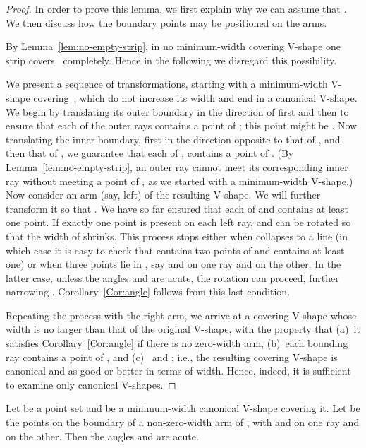 \documentclass{llncs}
\begin{document}
\begin{proof}

In order to prove this lemma, we first explain why we can assume
that .  We then discuss how
the boundary points may be positioned on the arms.


By Lemma~\ref{lem:no-empty-strip}, in no minimum-width covering V-shape
one strip covers~ completely.
Hence in the following we disregard this
possibility.

We present a sequence of transformations, starting with a minimum-width
V-shape covering~, which do not
increase its width and end in a canonical V-shape.  We begin by
translating its outer boundary in the direction of first  and
then  to ensure that each of the outer rays contains a point of ;
this point might be .  Now translating the inner boundary, first in
the direction opposite to that of , and then that of , we
guarantee that each of ,  contains a point of .  (By
Lemma~\ref{lem:no-empty-strip}, an outer ray  cannot meet its
corresponding inner ray  without meeting a point of , as we
started with a minimum-width V-shape.)  Now consider an arm (say,
left) of the resulting V-shape.  We will further transform it so that
.  We have so far ensured that each of
 and  contains at least one point.  If exactly one point is
present on each left ray,  and  can be rotated so that the
width of  shrinks.  
This process stops either when  collapses to a line (in which
case it is easy to check that  contains two points of  and
 contains at least one) or when three points 
lie in , say  and  on one ray and  on the
other.  In the latter case, unless the angles  and  are acute, the rotation can proceed, further narrowing .
Corollary~\ref{Cor:angle} follows from this last condition.


Repeating the process with the right arm, we arrive at a covering
V-shape whose width is no larger than that of the original V-shape,
with the property that (a)~it satisfies Corollary~\ref{Cor:angle} if there is no zero-width arm,
(b)~each bounding ray contains a point of , and (c)~ and ; i.e., the resulting covering V-shape is canonical and as good or
better in terms of width.  Hence, indeed, it is sufficient to examine
only canonical V-shapes.  \hfill 

\end{proof}

\begin{corollary}
  \label{Cor:angle}
  Let  be a point set and  be a minimum-width canonical V-shape
  covering it.  Let  be the points on the
  boundary of a non-zero-width arm of , with  and  on one
  ray and  on the other.  Then the angles 
  and  are acute.
\end{corollary}
\end{document}

